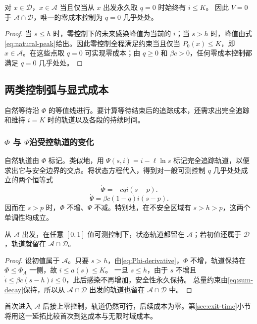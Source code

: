\documentclass[lang=cn,a4paper,newtx]{elegantpaper}
\theoremstyle{plain}
\theoremstyle{definition}
\newcommand{\Acal}{\mathcal A}
\newcommand{\Dcal}{\mathcal D}
\begin{document}
\begin{proposition}[最大无控制安全集]
\label{prop:safe-exact}
对 $x\in\Dcal$，$x\in\Acal$ 当且仅当从 $x$ 出发永久取 $q=0$ 时始终有 $i\le K$。
因此 $V=0$ 于 $\Acal\cap\Dcal$，唯一的零成本控制为 $q=0$ 几乎处处。
\end{proposition}
\begin{proof}
当 $s\le h$ 时，零控制下的未来感染峰值为当前的 $i$；当 $s>h$ 时，峰值由式\eqref{eq:natural-peak}给出。因此零控制全程满足约束当且仅当 $P_0(x)\le K$，即 $x\in\Acal$。在这些点取 $q=0$ 可实现零成本；由 $q\ge0$ 和 $\beta c>0$，任何零成本控制都满足 $q=0$ 几乎处处。
\end{proof}

\subsection{两类控制弧与显式成本}
\label{sec:arcs}
自然等待沿 $\Phi$ 的等值线进行。要计算等待结束后的追踪成本，还需求出完全追踪和维持 $i=K$ 时的轨道以及各段的持续时间。

\subsubsection{\texorpdfstring{$\Phi$ 与 $\Psi$}{Φ 与 Ψ}沿受控轨道的变化}
自然轨道由 $\Phi$ 标记。类似地，用 $\Psi(s,i)=i-\ell\ln s$ 标记完全追踪轨道，以便求出它与安全边界的交点。将状态方程代入，得到对一般可测控制 $q$ 几乎处处成立的两个恒等式
\begin{equation}
\boxed{\dot\Phi=-cqi(s-p).}
\label{eq:Phi-derivative}
\end{equation}
\begin{equation}
\dot\Psi=\beta c(1-q)i(s-p).
\label{eq:Psi-derivative}
\end{equation}
因而在 $s>p$ 时，$\Phi$ 不增、$\Psi$ 不减。特别地，在不安全区域有 $s>h>p$，这两个单调性均成立。

\begin{lemma}[安全集对控制的前向不变性]
\label{lem:safe-invariant}
从 $\Acal$ 出发，在任意 $[0,1]$ 值可测控制下，状态轨道都留在 $\Acal$；若初值还属于 $\Dcal$，轨道就留在 $\Acal\cap\Dcal$。
\end{lemma}
\begin{proof}
设初值属于 $\Acal$。只要 $s>h$，由\eqref{eq:Phi-derivative}，$\Phi$ 不增，轨道保持在 $\Phi\le\Phi_A$ 一侧，故 $i\le a(s)\le K$。
一旦 $s\le h$，由于 $s$ 不增且 $\dot i\le \beta c(s-h)i\le0$，此后感染不再增加，安全性永久保持。
总量约束由\eqref{eq:sum-decay}保持，所以从 $\Acal\cap\Dcal$ 出发的轨道也留在 $\Acal\cap\Dcal$ 中。
\end{proof}
首次进入 $\Acal$ 后接上零控制，轨道仍然可行，后续成本为零。第\ref{sec:exit-time}小节将用这一延拓比较首次到达成本与无限时域成本。
\end{document}
